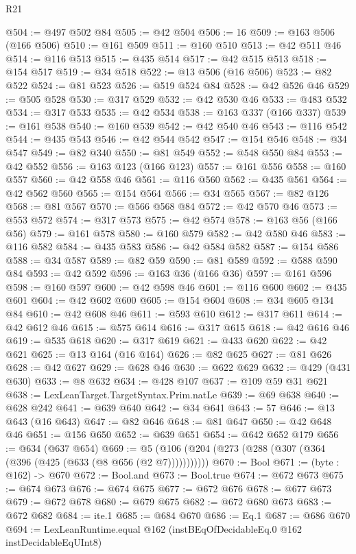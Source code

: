 \begin{lexlean}{R21}
\begin{coremodule}
@504 := @497 @502 @84
@505 := @42 @504
@506 := 16
@509 := @163 @506 (@166 @506)
@510 := @161 @509
@511 := @160 @510
@513 := @42 @511 @46
@514 := @116 @513
@515 := @435 @514
@517 := @42 @515 @513
@518 := @154 @517
@519 := @34 @518
@522 := @13 @506 (@16 @506)
@523 := @82 @522
@524 := @81 @523
@526 := @519 @524 @84
@528 := @42 @526 @46
@529 := @505 @528
@530 := @317 @529
@532 := @42 @530 @46
@533 := @483 @532
@534 := @317 @533
@535 := @42 @534
@538 := @163 @337 (@166 @337)
@539 := @161 @538
@540 := @160 @539
@542 := @42 @540 @46
@543 := @116 @542
@544 := @435 @543
@546 := @42 @544 @542
@547 := @154 @546
@548 := @34 @547
@549 := @82 @340
@550 := @81 @549
@552 := @548 @550 @84
@553 := @42 @552
@556 := @163 @123 (@166 @123)
@557 := @161 @556
@558 := @160 @557
@560 := @42 @558 @46
@561 := @116 @560
@562 := @435 @561
@564 := @42 @562 @560
@565 := @154 @564
@566 := @34 @565
@567 := @82 @126
@568 := @81 @567
@570 := @566 @568 @84
@572 := @42 @570 @46
@573 := @553 @572
@574 := @317 @573
@575 := @42 @574
@578 := @163 @56 (@166 @56)
@579 := @161 @578
@580 := @160 @579
@582 := @42 @580 @46
@583 := @116 @582
@584 := @435 @583
@586 := @42 @584 @582
@587 := @154 @586
@588 := @34 @587
@589 := @82 @59
@590 := @81 @589
@592 := @588 @590 @84
@593 := @42 @592
@596 := @163 @36 (@166 @36)
@597 := @161 @596
@598 := @160 @597
@600 := @42 @598 @46
@601 := @116 @600
@602 := @435 @601
@604 := @42 @602 @600
@605 := @154 @604
@608 := @34 @605 @134 @84
@610 := @42 @608 @46
@611 := @593 @610
@612 := @317 @611
@614 := @42 @612 @46
@615 := @575 @614
@616 := @317 @615
@618 := @42 @616 @46
@619 := @535 @618
@620 := @317 @619
@621 := @433 @620
@622 := @42 @621
@625 := @13 @164 (@16 @164)
@626 := @82 @625
@627 := @81 @626
@628 := @42 @627
@629 := @628 @46
@630 := @622 @629
@632 := @429 (@431 @630)
@633 := @8 @632
@634 := @428 @107
@637 := @109 @59 @31 @621
@638 := LexLeanTarget.TargetSyntax.Prim.natLe
@639 := @69 @638
@640 := @628 @242
@641 := @639 @640
@642 := @34 @641
@643 := 57
@646 := @13 @643 (@16 @643)
@647 := @82 @646
@648 := @81 @647
@650 := @42 @648 @46
@651 := @156 @650
@652 := @639 @651
@654 := @642 @652 @179
@656 := @634 (@637 @654)
@669 := @5 (@106 (@204 (@273 (@288 (@307 (@364 (@396 (@425 (@633 (@8 @656 (@2 @7)))))))))))
@670 := Bool
@671 := (byte : @162) -> @670
@672 := Bool.and
@673 := Bool.true
@674 := @672 @673
@675 := @674 @673
@676 := @674 @675
@677 := @672 @676
@678 := @677 @673
@679 := @672 @678
@680 := @679 @675
@682 := @672 @680 @673
@683 := @672 @682
@684 := ite.{1}
@685 := @684 @670
@686 := Eq.{1}
@687 := @686 @670
@694 := LexLeanRuntime.equal @162 (instBEqOfDecidableEq.{0} @162 instDecidableEqUInt8)

\end{coremodule}
\end{lexlean}

